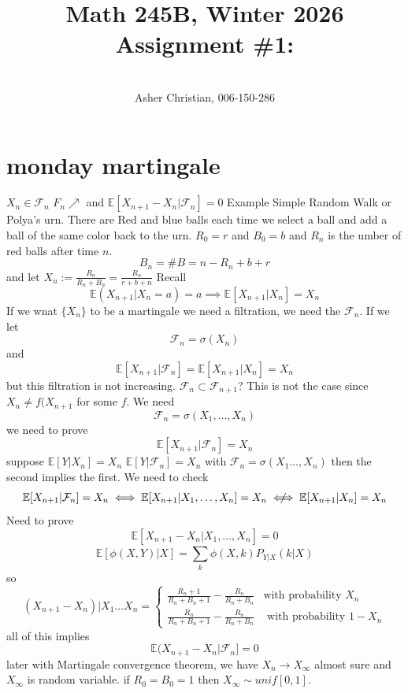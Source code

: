 \documentclass[11pt]{article}
\newcommand{\cnum}{Math 245B}
\newcommand{\ced}{Winter 2026}
\newcommand{\ctitle}[4]{\title{\vspace{-0.5in}\cnum, \ced\\Assignment #1: #2}\author{\vspace{-0.35in}\\#3, #4}}
\newcommand{\notiff}{%
  \mathrel{{\ooalign{\hidewidth$\not\phantom{"}$\hidewidth\cr$\iff$}}}}
\begin{document}
\ctitle{\#1}{}{Asher Christian}{006-150-286}
\date{}
\maketitle

\section{monday martingale}
$X_n \in \mathcal{F}_n$ $F_n \nearrow$ and  $ \mathbb{E}[ X_{n+1} - X_n | \mathcal{F}_n] = 0$
Example Simple Random Walk or Polya's urn. There are Red and blue balls each time we select a ball and add a ball of the same color back to the urn.
$R_0 = r$ and $B_0 = b$ and $ R_n$ is the umber of red balls after time  $n$.
\[
B_n = \#B = n - R_n + b + r
\] 
and let $X_n := \frac{R_n}{R_n + B_n}  = \frac{R_n}{r + b + n}$ Recall
\[
    \mathbb{E}( X_{n+1} | X_n = a) = a \implies \mathbb{E}[X_{n+1} | X_n] = X_n
\] 
If we wnat $\{X_n\}$ to be a martingale we need a filtration, we need the  $\mathcal{F}_n$. If we let
 \[
\mathcal{F}_n = \sigma( X_n)
\] 
and
\[
    \mathbb{E}[X_{n+1} | \mathcal{F}_n] = \mathbb{E}[X_{n+1} | X_n] = X_n
\] 
but this filtration is not increasing. $ \mathcal{F}_n \subset \mathcal{F}_{n+1}$? This is not the case since
$X_n \ne f(X_{n+1}$ for some  $f$. We need
 \[
 \mathcal{F}_n = \sigma(X_1,\dots,X_n)
\] 
we need to prove
\[
    \mathbb{E}[X_{n+1} | \mathcal{F}_n] = X_n
\] 
suppose $ \mathbb{E}[Y |X_n] = X_n$ $ \mathbb{E}[Y | \mathcal{F}_n]  = X_n$ with $ \mathcal{F}_n = \sigma(X_1\dots, X_n)$ then the second implies the first.
We need to check
\[
    \mathbb{E}[X_{n+1}| \mathcal{F}_n] = X_n \iff \mathbb{E}[X_{n+1} | X_1,\dots,X_n] = X_n \notiff \mathbb{E}[X_{n+1}|X_n] = X_n
\] 
Need to prove
\[
    \mathbb{E}[X_{n+1} - X_n | X_1,\dots,X_n] = 0
\] 
\[
    \mathbb{E}[\phi(X,Y)|X] = \sum_{k}^{}\phi(X,k) P_{Y|X}(k|X)
\] 
so
\[
    (X_{n+1} -X_n) | X_1 \dots X_n =
    \begin{cases}
        \frac{R_n+1}{R_n + B_n + 1} - \frac{R_n}{R_n + B_n} & \text{with probability $X_n$ }\\
        \frac{R_n}{R_n + B_n + 1} - \frac{R_n}{R_n + B_n} & \text{ with probability $1- X_n$}
    \end{cases}
\] 
all of this implies
\[
    \mathbb{E}(X_{n+1} - X_n | \mathcal{F}_n] = 0
\] 
later with Martingale convergence theorem, we have $X_n \rightarrow X_{\infty}$ almost sure and $X_{\infty}$ is random variable. if $R_0 = B_0 = 1$ then $X_\infty \sim unif[0,1]$.\\
\end{document}
